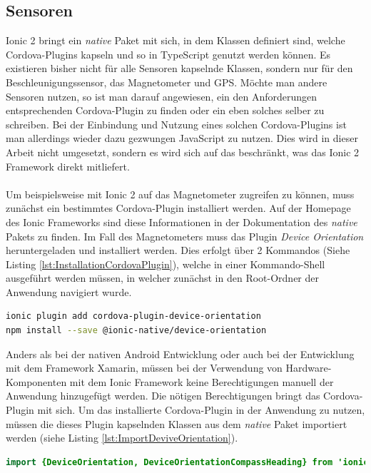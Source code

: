 \subsection*{Sensoren}

Ionic 2 bringt ein \textit{native} Paket mit sich, in dem Klassen definiert sind, welche Cordova-Plugins kapseln und so in TypeScript genutzt werden können. Es existieren bisher nicht für alle Sensoren kapselnde Klassen, sondern nur für den Beschleunigungssensor, das Magnetometer und GPS. Möchte man andere Sensoren nutzen, so ist man darauf angewiesen, ein den Anforderungen entsprechenden Cordova-Plugin zu finden oder ein eben solches selber zu schreiben. Bei der Einbindung und Nutzung eines solchen Cordova-Plugins ist man allerdings wieder dazu gezwungen JavaScript zu nutzen. Dies wird in dieser Arbeit nicht umgesetzt, sondern es wird sich auf das beschränkt, was das Ionic 2 Framework direkt mitliefert.
\\
\\
Um beispielsweise mit Ionic 2 auf das Magnetometer zugreifen zu können, muss zunächst ein bestimmtes Cordova-Plugin installiert werden. Auf der Homepage des Ionic Frameworks sind diese Informationen in der Dokumentation des \textit{native} Pakets zu finden. Im Fall des Magnetometers muss das Plugin \textit{Device Orientation} heruntergeladen und installiert werden. Dies erfolgt über 2 Kommandos (Siehe Listing \ref{lst:InstallationCordovaPlugin}), welche in einer Kommando-Shell ausgeführt werden müssen, in welcher zunächst in den Root-Ordner der Anwendung navigiert wurde. 

\begin{lstlisting}[caption=Installation des Cordova-Plugins für das Magnetometer, label=lst:InstallationCordovaPlugin, language=bash]
ionic plugin add cordova-plugin-device-orientation
npm install --save @ionic-native/device-orientation
\end{lstlisting}

Anders als bei der nativen Android Entwicklung oder auch bei der Entwicklung mit dem Framework Xamarin, müssen bei der Verwendung von Hardware-Komponenten mit dem Ionic Framework keine Berechtigungen manuell der Anwendung hinzugefügt werden. Die nötigen Berechtigungen bringt das Cordova-Plugin mit sich. Um das installierte Cordova-Plugin in der Anwendung zu nutzen, müssen die dieses Plugin kapselnden Klassen aus dem \textit{native} Paket importiert werden (siehe Listing \ref{lst:ImportDeviveOrientation}). 

\begin{lstlisting}[caption=Import der Klassen für die Nutzung des Magnetometers aus dem  \textit{native} Paket von Ionic 2, label=lst:ImportDeviveOrientation, language=Java]
import {DeviceOrientation, DeviceOrientationCompassHeading} from 'ionic-native';
\end{lstlisting}

